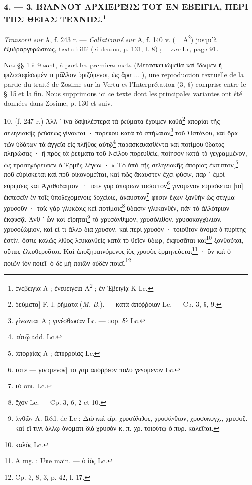 \documentclass[a4paper, 11pt, oneside, polutonikogreek, french]{article}
\begin{document}
\bigskip
\centerline{\EightStarTaper}
\centerline{\EightStarTaper\EightStarTaper}
\bigskip

\subsubsection[4. --- 3. ΙΩΑΝΝΟΥ ΑΡΧΙΕΡΕΩΣ ΤΟΥ ΕΝ ΕΒΕΙΓΙΑ, ΠΕΡΙ ΤΗΣ ΘΕΙΑΣ ΤΕΧΝΗΣ.]{4. --- 3. ΙΩΑΝΝΟΥ ΑΡΧΙΕΡΕΩΣ ΤΟΥ ΕΝ ΕΒΕΙΓΙΑ, ΠΕΡΙ ΤΗΣ ΘΕΙΑΣ ΤΕΧΝΗΣ.\footnote{ἐνεβειγία A ; ἐνευειγεία A\textsuperscript{2} ; ἐν Ἐβειγίᾳ K Lc.}}

\emph{Transcrit sur} A, f. 243 r. --- \emph{Collationné sur} A, f. 140 v. (= A\textsuperscript{2}) jusqu'à ἐξυδραργυρώσεως, texte biffé (ci-dessus, p. 131, l. 8) ;--- \emph{sur} Lc, page 91.

\bigskip

Nos §§ 1 à 9 sont, à part les premiers mots (Μετασκεψώμεθα καὶ ἴδωμεν ἢ φιλοσοφίσωμέν τι μᾶλλον ὁριζόμενοι, ὡς ἄρα ... ), une reproduction textuelle de la partie du traité de Zosime sur la Vertu et l'Interprétation (3, 6) comprise entre le § 15 et la fin. Nous supprimons ici ce texte dont les principales variantes ont été données dans Zosime, p. 130 et suiv.

\bigskip

10. (f. 247 r.) Ἀλλ ᾽ ἵνα δαψιλέστερα τὰ ῥεύματα ἔχοιμεν καθὰ\footnote{ῥεύματα] F. l. ῥήματα (\emph{M. B.}). --- κατὰ ἀπόῤῥοιαν Lc. --- Cp. 3, 6, 9.} ἀπορίαι τῆς σεληνιακῆς ῥεύσεως γίνονται · πορεύου κατὰ τὸ σπήλαιον\footnote{γίνωνται A ; γινέσθωσαν Lc. --- πορ. δὲ Lc.} τοῦ Ὀστάνου, καὶ ὅρα τῶν ὑδάτων τὰ ἀγγεῖα εἰς πλῆθος αὐτῷ\footnote{αὐτῷ add. Lc.} παρασκευασθέντα καὶ ποτίμου ὕδατος πληρώσας · ἢ πρὸς τὰ ῥεύματα τοῦ Νείλου πορευθεὶς, ποίησον κατὰ τὸ γεγραμμένον, ὡς προσηγόρευσεν ὁ Ἑρμῆς λέγων · « Τὸ ἀπὸ τῆς σεληνιακῆς ἀπορίας ἐκπίπτον,\footnote{ἀπορρίας A ; ἀπορροίας Lc.} ποῦ εὑρίσκεται καὶ ποῦ οἰκονομεῖται, καὶ πῶς ἄκαυστον ἔχει φύσιν, παρ ᾽ ἐμοὶ εὑρήσεις καὶ Ἀγαθοδαίμονι · τότε γὰρ ἀποριῶν τοσοῦτον\footnote{τότε --- γινόμενον] τὸ γὰρ ἀπὀῤῥέον πολὺ γενόμενον Lc.} γινόμενον εὑρίσκεται [τὸ] ἐκπεσεῖν ἐν τοῖς ὑποδεχομένοις δοχείοις, ἄκαυστον\footnote{τὸ om. Lc.} φύσιν ἔχων ξανθὴν ὡς στίγμα χρυσοῦν · τοῖς γὰρ γλυκέοις καὶ ποτίμοις\footnote{ἔχον Lc. --- Cp. 3, 6, 2 et 10.} ὕδασιν γλυκανθὲν, πᾶν τὸ ἀλλότριον ἐκφυσᾷ. Ἀνθ ᾽ ὧν καὶ εἴρηται\footnote{ἀνθῶν A. Réd. de Lc : Διὸ καὶ εἴρ. χρυσόλιθος, χρυσάνθιον, χρυσοκογχ., χρυσοζ. καὶ εἴ τινι ἄλλῳ ὀνόματι διὰ χρυσὸν κ. π. χρ. τοιούτῳ ὁ πυρ. καλεῖται.} τὸ χρυσάνθιμον, χρυσόλιθον, χρυσοκογχύλιον, χρυσοζώμιον, καὶ εἴ τι ἄλλο διὰ χρυσὸν, καὶ περὶ χρυσόν · τοιοῦτον ὄνομα ὁ πυρίτης ἐστὶν, ὅστις καλῶς λίθος λευκανθεὶς κατὰ τὸ θεῖον ὕδωρ, ἐκφυσᾶται καὶ\footnote{καλὸς Lc.} ξανθοῦται, οὕτως ἐλευθεροῦται. Καὶ ἀποξηραινόμενος ἰὸς χρυσὸς ἑρμηνεύεται\footnote{A mg. : Une main. --- ὁ ἰὸς Lc.} · ὃν καὶ ὁ ποιῶν ἰὸν ποιεῖ, ὁ δὲ μὴ ποιῶν οὐδὲν ποιεῖ.\footnote{Cp. 3, 8, 3, p. 42, l. 17.}
\end{document}
